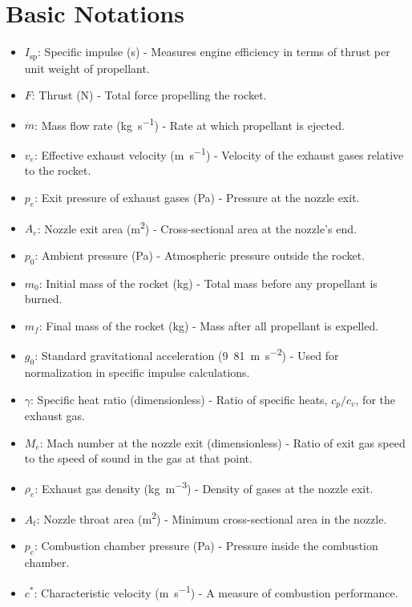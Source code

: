 \documentclass[12pt]{report}
\begin{document}
\section{Basic Notations}
\begin{multicols}{2}
    \begin{itemize}
        \item $I_{\text{sp}}$: Specific impulse (s) - Measures engine efficiency in terms of thrust per unit weight of propellant.
        \item $F$: Thrust (\si{\newton}) - Total force propelling the rocket.
        \item $\dot{m}$: Mass flow rate (\si{\kilogram\per\second}) - Rate at which propellant is ejected.
        \item $v_e$: Effective exhaust velocity (\si{\meter\per\second}) - Velocity of the exhaust gases relative to the rocket.
        \item $p_e$: Exit pressure of exhaust gases (\si{\pascal}) - Pressure at the nozzle exit.
        \item $A_e$: Nozzle exit area (\si{\meter\squared}) - Cross-sectional area at the nozzle's end.
        \item $p_0$: Ambient pressure (\si{\pascal}) - Atmospheric pressure outside the rocket.
        \item $m_0$: Initial mass of the rocket (\si{\kilogram}) - Total mass before any propellant is burned.
        \item $m_f$: Final mass of the rocket (\si{\kilogram}) - Mass after all propellant is expelled.
        \item $g_0$: Standard gravitational acceleration (\si{9.81\meter\per\second\squared}) - Used for normalization in specific impulse calculations.
        \item $\gamma$: Specific heat ratio (dimensionless) - Ratio of specific heats, $c_p/c_v$, for the exhaust gas.
        \item $M_e$: Mach number at the nozzle exit (dimensionless) - Ratio of exit gas speed to the speed of sound in the gas at that point.
        \item $\rho_e$: Exhaust gas density (\si{\kilogram\per\cubic\meter}) - Density of gases at the nozzle exit.
        \item $A_t$: Nozzle throat area (\si{\meter\squared}) - Minimum cross-sectional area in the nozzle.
        \item $p_c$: Combustion chamber pressure (\si{\pascal}) - Pressure inside the combustion chamber.
        \item $c^*$: Characteristic velocity (\si{\meter\per\second}) - A measure of combustion performance.
    \end{itemize}
\end{multicols}
\end{document}
